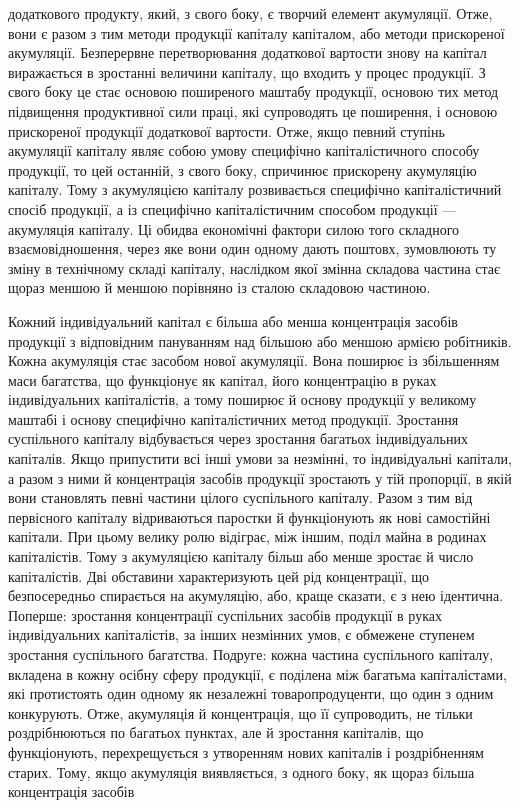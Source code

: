 \parcont{}  %
додаткового продукту, який, з свого боку, є творчий елемент
акумуляції. Отже, вони є разом з тим методи продукції капіталу
капіталом, або методи прискореної акумуляції. Безперервне
перетворювання додаткової вартости знову на капітал виражається
в зростанні величини капіталу, що входить у процес продукції.
З свого боку це стає основою поширеного маштабу продукції,
основою тих метод підвищення продуктивної сили праці,
які супроводять це поширення, і основою прискореної продукції
додаткової вартости. Отже, якщо певний ступінь акумуляції
капіталу являє собою умову специфічно капіталістичного способу
продукції, то цей останній, з свого боку, спричинює прискорену
акумуляцію капіталу. Тому з акумуляцією капіталу розвивається
специфічно капіталістичний спосіб продукції, а із специфічно
капіталістичним способом продукції — акумуляція капіталу.
Ці обидва економічні фактори силою того складного взаємовідношення,
через яке вони один одному дають поштовх,
зумовлюють ту зміну в технічному складі капіталу, наслідком
якої змінна складова частина стає щораз меншою й меншою порівняно
із сталою складовою частиною.

Кожний індивідуальний капітал є більша або менша концентрація
засобів продукції з відповідним пануванням над більшою
або меншою армією робітників. Кожна акумуляція стає засобом
нової акумуляції. Вона поширює із збільшенням маси багатства,
що функціонує як капітал, його концентрацію в руках індивідуальних
капіталістів, а тому поширює й основу продукції
у великому маштабі і основу специфічно капіталістичних метод
продукції. Зростання суспільного капіталу відбувається через
зростання багатьох індивідуальних капіталів. Якщо припустити
всі інші умови за незмінні, то індивідуальні капітали, а разом
з ними й концентрація засобів продукції зростають у тій пропорції,
в якій вони становлять певні частини цілого суспільного
капіталу. Разом з тим від первісного капіталу відриваються
паростки й функціонують як нові самостійні капітали. При цьому
велику ролю відіграє, між іншим, поділ майна в родинах капіталістів.
Тому з акумуляцією капіталу більш або менше зростає
й число капіталістів. Дві обставини характеризують цей рід
концентрації, що безпосередньо спирається на акумуляцію,
або, краще сказати, є з нею ідентична. Поперше: зростання концентрації
суспільних засобів продукції в руках індивідуальних
капіталістів, за інших незмінних умов, є обмежене ступенем
зростання суспільного багатства. Подруге: кожна частина суспільного
капіталу, вкладена в кожну осібну сферу продукції,
є поділена між багатьма капіталістами, які протистоять один
одному як незалежні товаропродуценти, що один з одним конкурують.
Отже, акумуляція й концентрація, що її супроводить,
не тільки роздрібнюються по багатьох пунктах, але й зростання
капіталів, що функціонують, перехрещується з утворенням нових
капіталів і роздрібненням старих. Тому, якщо акумуляція виявляється,
з одного боку, як щораз більша концентрація засобів
\parbreak{}  %
